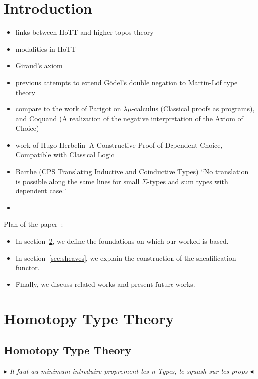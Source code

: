 \documentclass[conference]{IEEEtran}
\newcommand{\mynote}[2]{
    \fbox{\bfseries\sffamily\scriptsize#1}
    {\small$\blacktriangleright$\textsf{\emph{#2}}$\blacktriangleleft$}~}
\newcommand\nt[1]{\mynote{NT}{#1}}
\begin{document}

\section{Introduction}
\label{sec:intro}

\begin{itemize}
\item 
  links between HoTT and higher topos theory 
\item 
  modalities in HoTT
\item 
  Giraud's axiom
\item
  previous attempts to extend Gödel's double negation to 
  Martin-Löf type theory
\item 
  compare to the work of Parigot on $\lambda\mu$-calculus (Classical proofs as programs), and Coquand 
  (A realization of the negative interpretation of the Axiom of
  Choice)
\item
  work of Hugo Herbelin, A Constructive Proof of Dependent Choice,
  Compatible with Classical Logic
\item
  Barthe (CPS Translating Inductive and Coinductive Types)
  ``No translation is possible along the same lines for small $\Sigma$-types
  and sum types with dependent case.''
\item 
  
\end{itemize}


Plan of the paper~:
\begin{itemize}
\item In section~\ref{sec:hott}, we define the foundations on which
  our worked is based.
\item In section~\ref{sec:sheaves}, we explain the construction of the
  sheafification functor.
\item Finally, we discuss related works and present future works.
\end{itemize}
\section{Homotopy Type Theory}
\label{sec:hott}


\subsection{Homotopy Type Theory}
\label{ssec:hott}

\nt{
  Il faut au minimum introduire proprement les n-Types, le squash
  sur les props 
}
\end{document}
